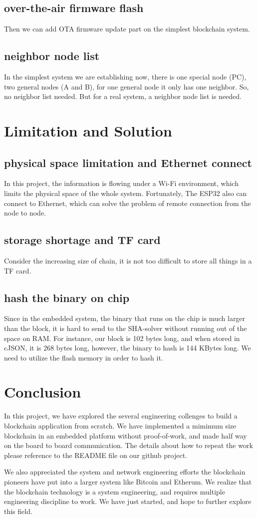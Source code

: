\documentclass{article}
\begin{document}
    \subsection{over-the-air firmware flash}
    Then we can add OTA firmware update part on the simplest blockchain system.
    \subsection{neighbor node list}
    In the simplest system we are establishing now, there is one special node (PC), two general nodes (A and B), for one general node it only has one neighbor. So, no neighbor list needed. But for a real system, a neighbor node list is needed.

\section{Limitation and Solution}
    \subsection{physical space limitation and Ethernet connect}
    In this project, the information is flowing under a Wi-Fi environment, which limits the physical space of the whole system. Fortunately, The ESP32 also can connect to Ethernet, which can solve the problem of remote connection from the node to node.
    \subsection{storage shortage and TF card}
    Consider the increasing size of chain, it is not too difficult to store all things in a TF card.
    \subsection{hash the binary on chip}
    Since in the embedded system, the binary that runs on the chip is much larger than the block, it is hard to send to the SHA-solver without running out of the space on RAM. For instance, our block is 102 bytes long, and when stored in cJSON, it is 268 bytes long, however, the binary to hash is 144 KBytes long. We need to utilize the flash memory in order to hash it.

\section{Conclusion}
    In this project, we have explored the several engineering collenges to build a blockchain application from scratch. We have implemented a mimimum size blockchain in an embedded platform without proof-of-work, and made half way on the board to board communication. The details about how to repeat the work please reference to the README file on our github project.

    We also appreciated the system and network engineering efforts the blockchain pioneers have put into a larger system like Bitcoin and Etherum. We realize that the blockchain technology is a system engineering, and requires multiple engineering discipline to work. We have just started, and hope to further explore this field.



\end{document}
